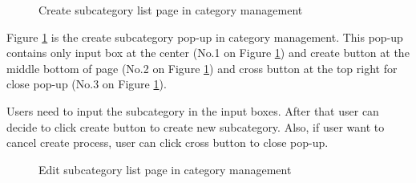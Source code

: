 \documentclass[12pt,oneside,openright,a4paper]{cpe-english-project}
\begin{document}
		\begin{figure}[!h]\centering
			\caption{Create subcategory list page in category management}\label{fig:Create_subcategory_list_page_in_category_management_done}
		\end{figure}
		\begin{flushleft}
			Figure \ref*{fig:Create_subcategory_list_page_in_category_management_done} is the create subcategory pop-up in category management. This pop-up contains only input box at the center (No.1 on Figure \ref*{fig:Create_subcategory_list_page_in_category_management_done}) and create button at the middle bottom of page (No.2 on Figure \ref*{fig:Create_subcategory_list_page_in_category_management_done}) and cross button at the top right for close pop-up (No.3 on Figure \ref*{fig:Create_subcategory_list_page_in_category_management_done}).
		\end{flushleft}
		\begin{flushleft}
			Users need to input the subcategory in the input boxes. After that user can decide to click create button to create new subcategory. Also, if user want to cancel create process, user can click cross button to close pop-up.
		\end{flushleft}
\pagebreak
		\begin{figure}[!h]\centering
			\caption{Edit subcategory list page in category management}\label{fig:Edit_subcategory_list_page_in_category_management_done}
		\end{figure}
\end{document}
